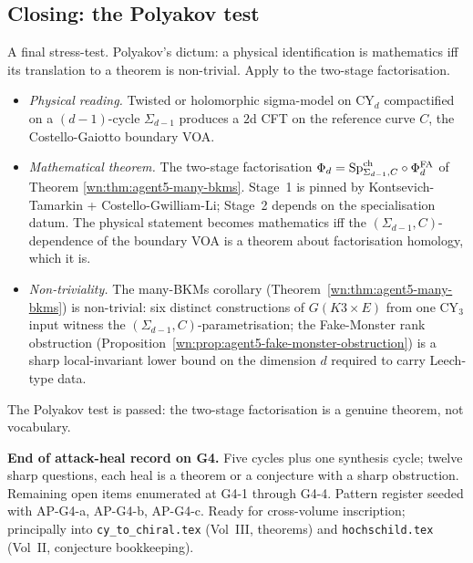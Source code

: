 \subsection*{Closing: the Polyakov test}

A final stress-test. Polyakov's dictum: a physical identification is
mathematics iff its translation to a theorem is non-trivial. Apply to
the two-stage factorisation.
\begin{itemize}
\item \emph{Physical reading.} Twisted or holomorphic sigma-model on
$\mathrm{CY}_d$ compactified on a $(d-1)$-cycle $\Sigma_{d-1}$
produces a $2$d CFT on the reference curve $C$, the Costello-Gaiotto
boundary VOA.
\item \emph{Mathematical theorem.} The two-stage factorisation
$\Phi_d = \mathrm{Sp}^{\mathrm{ch}}_{\Sigma_{d-1}, C} \circ \Phi^{\mathrm{FA}}_d$ of Theorem
\ref{wn:thm:agent5-many-bkms}. Stage~1 is pinned by
Kontsevich-Tamarkin + Costello-Gwilliam-Li; Stage~2 depends on the
specialisation datum. The physical statement becomes mathematics iff
the $(\Sigma_{d-1}, C)$-dependence of the boundary VOA is a theorem
about factorisation homology, which it is.
\item \emph{Non-triviality.} The many-BKMs corollary
(Theorem~\ref{wn:thm:agent5-many-bkms}) is non-trivial: six distinct
constructions of $G(K3 \times E)$ from one CY$_3$ input witness the
$(\Sigma_{d-1}, C)$-parametrisation; the Fake-Monster rank obstruction
(Proposition~\ref{wn:prop:agent5-fake-monster-obstruction}) is a sharp
local-invariant lower bound on the dimension $d$ required to carry
Leech-type data.
\end{itemize}

The Polyakov test is passed: the two-stage factorisation is a genuine
theorem, not vocabulary.

\medskip
\noindent\textbf{End of attack-heal record on G4.} Five cycles plus one
synthesis cycle; twelve sharp questions, each heal is a theorem or a
conjecture with a sharp obstruction. Remaining open items enumerated
at G4-1 through G4-4. Pattern register seeded with AP-G4-a, AP-G4-b,
AP-G4-c. Ready for cross-volume inscription; principally into
\texttt{cy\_to\_chiral.tex} (Vol~III, theorems) and
\texttt{hochschild.tex} (Vol~II, conjecture bookkeeping).
